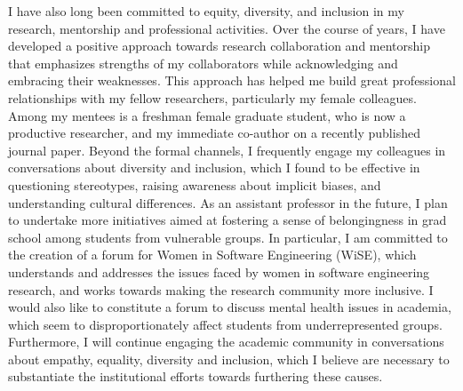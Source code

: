 I have also long been committed to equity, diversity, and inclusion in
my research, mentorship and professional activities. Over the course
of years, I have developed a positive approach towards research
collaboration and mentorship that emphasizes strengths of my
collaborators while acknowledging and embracing their weaknesses. This
approach has helped me build great professional relationships with my
fellow researchers, particularly my female colleagues. Among my
mentees is a freshman female graduate student, who is now a productive
researcher, and my immediate co-author on a recently published journal
paper.  Beyond the formal channels, I frequently engage my colleagues
in conversations about diversity and inclusion, which I found to be
effective in questioning stereotypes, raising awareness about implicit
biases, and understanding cultural differences. As an assistant
professor in the future, I plan to undertake more initiatives aimed at
fostering a sense of belongingness in grad school among students from
vulnerable groups. In particular, I am committed to the creation of a
forum for Women in Software Engineering (WiSE), which understands and
addresses the issues faced by women in software engineering research,
and works towards making the research community more inclusive. I
would also like to constitute a forum to discuss mental health issues
in academia, which seem to disproportionately affect students from
underrepresented groups. Furthermore, I will continue engaging the
academic community in conversations about empathy, equality, diversity
and inclusion, which I believe are necessary to substantiate the
institutional efforts towards furthering these causes.

